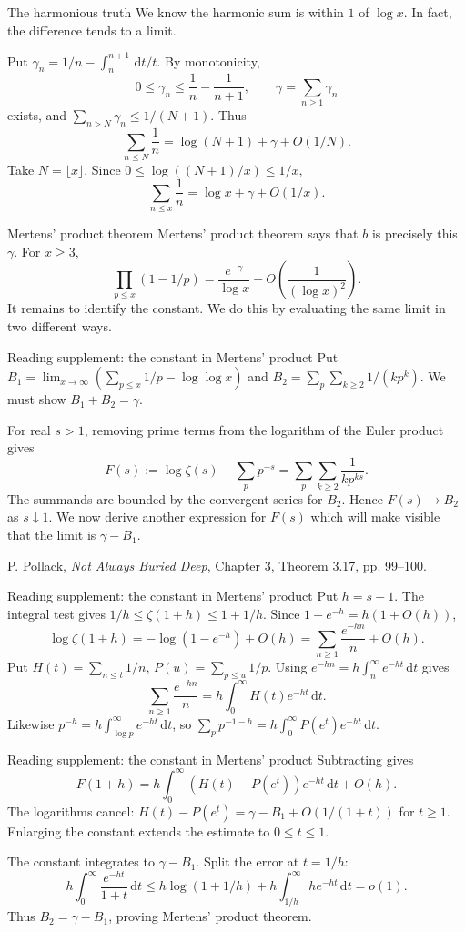 \documentclass[aspectratio=169,11pt]{beamer}
\newcommand{\dd}{\,\mathrm d}
\begin{document}
\begin{frame}{The harmonious truth}
We know the harmonic sum is within $1$ of $\log x$. In fact, the difference tends to a limit.

Put $\gamma_n=1/n-\int_n^{n+1}\dd t/t$. By monotonicity,
\[0\le\gamma_n\le\frac1n-\frac1{n+1},\qquad \gamma=\sum_{n\ge1}\gamma_n\]
exists, and $\sum_{n>N}\gamma_n\le1/(N+1)$. Thus
\[\sum_{n\le N}\frac1n=\log(N+1)+\gamma+O(1/N).\]
Take $N=\lfloor x\rfloor$. Since $0\le\log((N+1)/x)\le1/x$,
\[\sum_{n\le x}\frac1n=\log x+\gamma+O(1/x).\]
\end{frame}
\begin{frame}{Mertens' product theorem}
Mertens' product theorem says that $b$ is precisely this $\gamma$. For $x\ge3$,
\[\prod_{p\le x}(1-1/p)=\frac{e^{-\gamma}}{\log x}+O\left(\frac1{(\log x)^2}\right).\]
It remains to identify the constant. We do this by evaluating the same limit in two different ways.
\end{frame}
\begin{frame}{Reading supplement: the constant in Mertens' product}
Put $B_1=\lim_{x\to\infty}(\sum_{p\le x}1/p-\log\log x)$ and $B_2=\sum_p\sum_{k\ge2}1/(kp^k)$. We must show $B_1+B_2=\gamma$.

For real $s>1$, removing prime terms from the logarithm of the Euler product gives
\[F(s):=\log\zeta(s)-\sum_p p^{-s}=\sum_p\sum_{k\ge2}\frac1{kp^{ks}}.\]
The summands are bounded by the convergent series for $B_2$. Hence $F(s)\to B_2$ as $s\downarrow1$. We now derive another expression for $F(s)$ which will make visible that the limit is $\gamma-B_1$.

{\footnotesize P. Pollack, \emph{Not Always Buried Deep}, Chapter 3, Theorem 3.17, pp. 99--100.}
\end{frame}
\begin{frame}{Reading supplement: the constant in Mertens' product}
Put $h=s-1$. The integral test gives $1/h\le\zeta(1+h)\le1+1/h$. Since $1-e^{-h}=h(1+O(h))$,
\[\log\zeta(1+h)=-\log(1-e^{-h})+O(h)=\sum_{n\ge1}\frac{e^{-hn}}n+O(h).\]
Put $H(t)=\sum_{n\le t}1/n$, $P(u)=\sum_{p\le u}1/p$. Using $e^{-hn}=h\int_n^\infty e^{-ht}\dd t$ gives
\[\sum_{n\ge1}\frac{e^{-hn}}n=h\int_0^\infty H(t)e^{-ht}\dd t.\]
Likewise $p^{-h}=h\int_{\log p}^\infty e^{-ht}\dd t$, so $\sum_p p^{-1-h}=h\int_0^\infty P(e^t)e^{-ht}\dd t$.
\end{frame}
\begin{frame}{Reading supplement: the constant in Mertens' product}
Subtracting gives
\[F(1+h)=h\int_0^\infty(H(t)-P(e^t))e^{-ht}\dd t+O(h).\]
The logarithms cancel: $H(t)-P(e^t)=\gamma-B_1+O(1/(1+t))$ for $t\ge1$. Enlarging the constant extends the estimate to $0\le t\le1$.

The constant integrates to $\gamma-B_1$. Split the error at $t=1/h$:
\[h\int_0^\infty\frac{e^{-ht}}{1+t}\dd t\le h\log(1+1/h)+h\int_{1/h}^\infty he^{-ht}\dd t=o(1).\]
Thus $B_2=\gamma-B_1$, proving Mertens' product theorem.
\end{frame}
\end{document}
